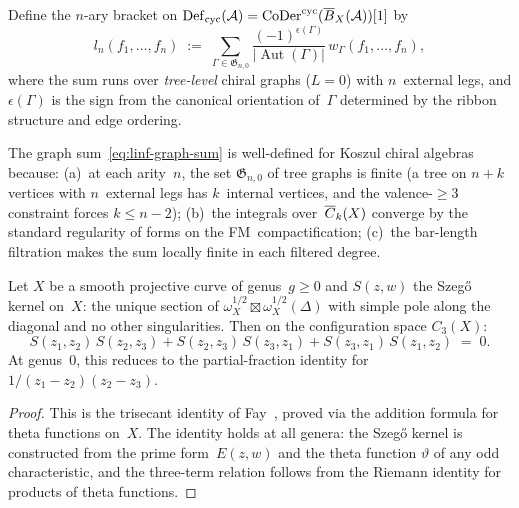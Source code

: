\begin{construction}\label{constr:linf-from-graphs}
Define the $n$-ary bracket on
$\operatorname{Def}_{\mathrm{cyc}}(\mathcal{A}) = \operatorname{CoDer}^{\mathrm{cyc}}(\overline{B}_X(\mathcal{A}))[1]$
by
\begin{equation}\label{eq:linf-graph-sum}
l_n(f_1, \ldots, f_n)
\;:=\;
\sum_{\Gamma \in \mathfrak{G}_{n,0}}
\frac{(-1)^{\epsilon(\Gamma)}}
{\lvert\operatorname{Aut}(\Gamma)\rvert}
\, w_\Gamma(f_1, \ldots, f_n),
\end{equation}
where the sum runs over \emph{tree-level} chiral graphs ($L = 0$) with
$n$~external legs, and $\epsilon(\Gamma)$ is the sign from the
canonical orientation of~$\Gamma$ determined by the ribbon structure
and edge ordering.
\end{construction}

The graph sum~\eqref{eq:linf-graph-sum} is well-defined for Koszul
chiral algebras because:
(a)~at each arity~$n$, the set $\mathfrak{G}_{n,0}$ of tree graphs
is finite (a tree on $n + k$ vertices with $n$~external legs has
$k$~internal vertices, and the valence-$\geq 3$ constraint forces
$k \leq n - 2$);
(b)~the integrals over~$\overline{C}_{k}(X)$ converge by the
standard regularity of forms on the FM~compactification;
(c)~the bar-length filtration makes the sum locally finite in each
filtered degree.

\begin{proposition}\label{prop:fay-trisecant}
Let $X$ be a smooth projective curve of genus~$g \geq 0$ and
$S(z,w)$ the Szeg\H{o} kernel on~$X$: the unique section of
$\omega_X^{1/2} \boxtimes \omega_X^{1/2}(\Delta)$ with simple pole
along the diagonal and no other singularities.  Then on the
configuration space $C_3(X)$:
\begin{equation}\label{eq:algebraic-fay}
S(z_1, z_2)\,S(z_2, z_3) + S(z_2, z_3)\,S(z_3, z_1) +
S(z_3, z_1)\,S(z_1, z_2) \;=\; 0.
\end{equation}
At genus~$0$, this reduces to the partial-fraction identity for
$1/(z_1-z_2)(z_2-z_3)$.
\end{proposition}

\begin{proof}
This is the trisecant identity of Fay~\cite[Corollary~2.5]{Fay73},
proved via the addition formula for theta functions on~$X$.
The identity holds at all genera: the Szeg\H{o} kernel is
constructed from the prime form~$E(z,w)$ and the theta function
$\vartheta$ of any odd characteristic, and the three-term relation
follows from the Riemann identity for products of theta functions.
\end{proof}

